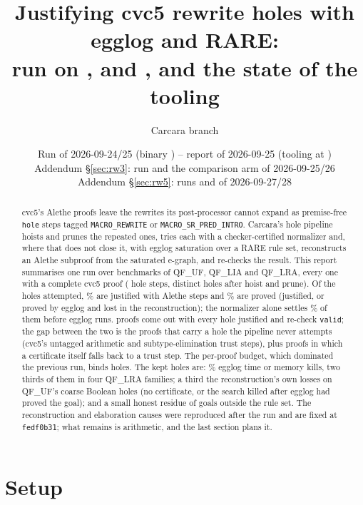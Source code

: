 \documentclass[11pt,a4paper]{article}
\title{Justifying cvc5 rewrite holes with egglog and RARE:\\
  run \code{rw2} on \UF{}, \LIA{} and \LRA{}, and the state of the tooling}
\author{Carcara branch \code{egglog/rewrite-holes}}
\date{Run of 2026-09-24/25 (binary \code{3f982c71}) -- report of 2026-09-25 (tooling at \code{fedf0b31})\\
  Addendum \S\ref{sec:rw3}: run \code{rw3} and the \code{dsl1} comparison arm of 2026-09-25/26\\
  Addendum \S\ref{sec:rw5}: runs \code{rw4} and \code{rw5} of 2026-09-27/28}
\newcommand{\UF}{QF\_UF}
\newcommand{\LIA}{QF\_LIA}
\newcommand{\LRA}{QF\_LRA}
\newcommand{\code}[1]{\texttt{#1}}
\begin{document}
\maketitle

\begin{abstract}
  cvc5's Alethe proofs leave the rewrites its post-processor cannot expand
  as premise-free \code{hole} steps tagged \code{MACRO\_REWRITE} or
  \code{MACRO\_SR\_PRED\_INTRO}. Carcara's hole pipeline hoists and prunes
  the repeated ones, tries each with a checker-certified normalizer and,
  where that does not close it, with egglog saturation over a RARE rule
  set, reconstructs an Alethe subproof from the saturated e-graph, and
  re-checks the result. This report summarises one run over \ntasks{}
  benchmarks of \UF{}, \LIA{} and \LRA{}, every one with a complete cvc5
  proof (\nholesteps{} hole steps, \nholes{} distinct holes after hoist and
  prune). Of the holes attempted, \njustshare\% are justified with Alethe
  steps and \nprovedshare\% are proved (justified, or proved by egglog and
  lost in the reconstruction); the normalizer alone settles \normshare\%
  of them before egglog runs. \nfully{} proofs come out with every hole
  justified and \nvalid{} re-check \code{valid}; the gap between the two is
  the \nuntagged{} proofs that carry a hole the pipeline never attempts
  (cvc5's untagged arithmetic and subtype-elimination trust steps), plus
  \nfullycleanholey{} proofs in which a certificate itself falls back to a
  trust step. The per-proof budget, which dominated the previous run, binds
  \nskipped{} holes. The \nkept{} kept holes are: \eggshare\% egglog time
  or memory kills, two thirds of them in four \LRA{} families; a third the
  reconstruction's own losses on \UF{}'s coarse Boolean holes (no
  certificate, or the search killed after egglog had proved the goal);
  and a small honest residue of goals outside the rule set. The
  reconstruction and elaboration causes were reproduced after the run and
  are fixed at \code{fedf0b31}; what remains is arithmetic, and the last
  section plans it.
\end{abstract}

\section{Setup}
\end{document}
